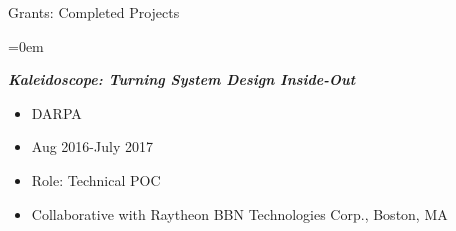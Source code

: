 \documentclass{resume} %
\begin{document}
\begin{rSection}{Grants: Completed Projects}
\begin{itemize}{}{\leftmargin=0em}
\end{itemize}




\textbf{\textit{Kaleidoscope: Turning System Design Inside-Out}}
\vspace{-.1in}
\begin{itemize}{}{\leftmargin=0em}
   \itemsep -0.6em %
   \item
DARPA
\item
Aug 2016-July 2017
   \item
Role: Technical POC
\item Collaborative with
Raytheon BBN Technologies Corp., Boston, MA


\end{itemize}
\vspace{-.1in}

\end{rSection}
\end{document}

